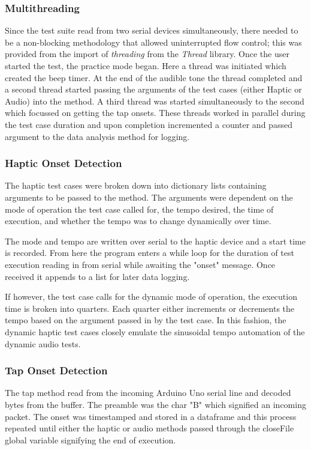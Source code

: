 \subsubsection{Multithreading}
Since the test suite read from two serial devices simultaneously, there needed to be a non-blocking methodology that allowed uninterrupted flow control; this was provided from the import of \textit{threading} from the \textit{Thread} library. Once the user started the test, the practice mode began. Here a thread was initiated which created the beep timer. At the end of the audible tone the thread completed and a second thread started passing the arguments of the test cases (either Haptic or Audio) into the method. A third thread was started simultaneously to the second which focussed on getting the tap onsets. These threads worked in parallel during the test case duration and upon completion incremented a counter and passed argument to the data analysis method for logging.
\subsubsection{Haptic Onset Detection}
The haptic test cases were broken down into dictionary lists containing arguments to be passed to the  method. The arguments were dependent on the mode of operation the test case called for, the tempo desired, the time of execution, and whether the tempo was to change dynamically over time.

The mode and tempo are written over serial to the haptic device and a start time is recorded. From here the program enters a while loop for the duration of test execution reading in from serial while awaiting the "onset" message. Once received it appends to a list for later data logging.

If however, the test case calls for the dynamic mode of operation, the execution time is broken into quarters. Each quarter either increments or decrements the tempo based on the argument passed in by the test case. In this fashion, the dynamic haptic test cases closely emulate the sinusoidal tempo automation of the dynamic audio tests.
\subsubsection{Tap Onset Detection}
The tap method read from the incoming Arduino Uno serial line and decoded bytes from the buffer. The preamble was the char "B" which signified an incoming packet. The onset was timestamped and stored in a dataframe and this process repeated until either the haptic or audio methods passed through the closeFile global variable signifying the end of execution.
